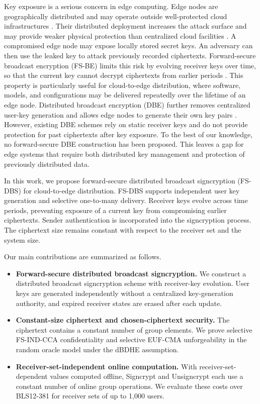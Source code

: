 \documentclass[sigconf,anonymous]{acmart}
\theoremstyle{definition}
\theoremstyle{definition}
\theoremstyle{definition}
\theoremstyle{definition}
\theoremstyle{definition}
\theoremstyle{definition}
\theoremstyle{definition}
\theoremstyle{definition}
\theoremstyle{definition}
\begin{document}
Key exposure is a serious concern in edge computing. Edge nodes are geographically distributed and may operate outside well-protected cloud infrastructures \cite{ETSIEdgeNative2023}. Their distributed deployment increases the attack surface and may provide weaker physical protection than centralized cloud facilities \cite{NISTIR8320}. A compromised edge node may expose locally stored secret keys. An adversary can then use the leaked key to attack previously recorded ciphertexts. Forward-secure broadcast encryption (FS-BE) limits this risk by evolving receiver keys over time, so that the current key cannot decrypt ciphertexts from earlier periods \cite{yao2004complex,attrapadung2006forward}. This property is particularly useful for cloud-to-edge distribution, where software, models, and configurations may be delivered repeatedly over the lifetime of an edge node. Distributed broadcast encryption (DBE) further removes centralized user-key generation and allows edge nodes to generate their own key pairs \cite{kolonelos2023distributed}. However, existing DBE schemes rely on static receiver keys and do not provide protection for past ciphertexts after key exposure. To the best of our knowledge, no forward-secure DBE construction has been proposed. This leaves a gap for edge systems that require both distributed key management and protection of previously distributed data.

In this work, we propose forward-secure distributed broadcast signcryption (FS-DBS) for cloud-to-edge distribution. FS-DBS supports independent user key generation and selective one-to-many delivery. Receiver keys evolve across time periods, preventing exposure of a current key from compromising earlier ciphertexts. Sender authentication is incorporated into the signcryption process. The ciphertext size remains constant with respect to the receiver set and the system size.

Our main contributions are summarized as follows.

\begin{itemize}
	
	\item \textbf{Forward-secure distributed broadcast signcryption.}
	We construct a distributed broadcast signcryption scheme with receiver-key evolution. User keys are generated independently without a centralized key-generation authority, and expired receiver states are erased after each update.
	
	\item \textbf{Constant-size ciphertext and chosen-ciphertext security.}
	The ciphertext contains a constant number of group elements. We prove selective FS-IND-CCA confidentiality and selective EUF-CMA unforgeability in the random oracle model under the dBDHE assumption.
	
	\item \textbf{Receiver-set-independent online computation.}
	With receiver-set-dependent values computed offline, Signcrypt and Unsigncrypt each use a constant number of online group operations. We evaluate these costs over BLS12-381 for receiver sets of up to 1,000 users.
	
\end{itemize}
\end{document}
